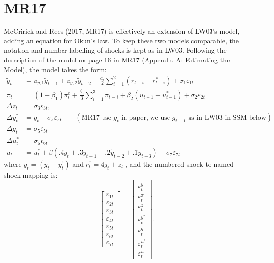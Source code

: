 \documentclass[a4paper,12pt]{article}
\begin{document}
\section{MR17}

McCririck and Rees (2017, MR17) is effectively an extension of LW03's model,
adding an equation for Okun's law. To keep these two models comparable, the
notation and number labelling of shocks is kept as in LW03. Following the
description of the model on page 16 in MR17 (Appendix A: Estimating the
Model), the model takes the form:%
\begin{align}
\tilde{y}_{t}& =a_{y,1}\tilde{y}_{t-1}+a_{y,2}\tilde{y}_{t-2}-\frac{a_{r}}{2}%
\sum_{i=1}^{2}(r_{t-i}-r_{t-i}^{\ast })+\sigma _{1}\varepsilon _{1t}
\label{MR1} \\
\pi _{t}& =(1-\beta _{1})\pi _{t}^{e}+\frac{\beta _{1}}{3}\sum_{i=1}^{3}\pi
_{t-i}+\beta _{2}(u_{t-1}-u_{t-1}^{\ast })+\sigma _{2}\varepsilon _{2t}
\label{MR2} \\
\Delta z_{t}& =\sigma _{3}\varepsilon _{3t},  \label{MR3} \\
\Delta y_{t}^{\ast }& =g_{t}+\sigma _{4}\varepsilon _{4t}\qquad (\text{MR17
use }g_{t}\text{ in paper, we use }g_{t-1}\text{ as in LW03 in SSM below})
\label{MR4} \\
\Delta g_{t}& =\sigma _{5}\varepsilon _{5t}  \label{MR5} \\
\Delta u_{t}^{\ast }& =\sigma _{6}\varepsilon _{6t}  \label{MR6} \\
u_{t}& =u_{t}^{\ast }+\beta (.4\tilde{y}_{t}+.3\tilde{y}_{t-1}+.2\tilde{y}%
_{t-2}+.1\tilde{y}_{t-3})+\sigma _{7}\varepsilon _{7t}  \label{MR7}
\end{align}%
where $\tilde{y}_{t}=(y_{t}-y_{t}^{\ast })$ and $r_{t}^{\ast }=4g_{t}+z_{t}$%
, and the numbered shock to named shock mapping is: 
\begin{equation}
\begin{bmatrix}
\varepsilon _{1t} \\ 
\varepsilon _{2t} \\ 
\varepsilon _{3t} \\ 
\varepsilon _{4t} \\ 
\varepsilon _{5t} \\ 
\varepsilon _{6t} \\ 
\varepsilon _{7t}%
\end{bmatrix}%
=%
\begin{bmatrix}
\varepsilon _{t}^{\tilde{y}} \\ 
\varepsilon _{t}^{\pi } \\ 
\varepsilon _{t}^{z} \\ 
\varepsilon _{t}^{y^{\ast }} \\ 
\varepsilon _{t}^{g} \\ 
\varepsilon _{t}^{u^{\ast }} \\ 
\varepsilon _{t}^{u}%
\end{bmatrix}%
.
\end{equation}
\end{document}
